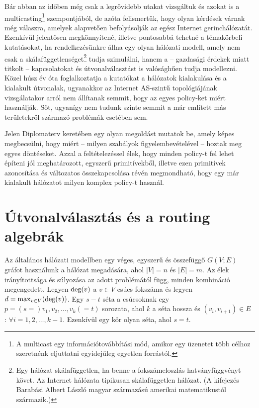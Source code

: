   Bár abban az időben még csak a legrövidebb utakat vizsgáltuk és azokat is a multicasting\footnote{A multicast egy információtovábbítási mód, amikor egy üzenetet több célhoz szeretnénk eljuttatni egyidejűleg egyetlen forrástól.} szempontjából, de azóta felismertük, hogy olyan kérdések várnak még válaszra, amelyek alapvetően befolyásolják az egész Internet gerinchálózatát. Ezenkívül jelentősen megkönnyítené, illetve pontosabbá tehetné a témakörbeli kutatásokat, ha rendelkezésünkre állna egy olyan hálózati modell, amely nem csak a skálafüggetlenséget\footnote{Egy hálózat skálafüggetlen, ha benne a fokszámeloszlás hatványfüggvényt követ. Az Internet hálózata tipikusan skálafüggetlen hálózat. (A kifejezés Barabási Albert László magyar származású amerikai matematikustól származik.)} tudja szimulálni, hanem a -- gazdasági érdekek miatt titkolt -- kapcsolatokat és útvonalválasztást is valósághűen tudja modellezni.\\

  Közel húsz év óta foglalkoztatja a kutatókat a hálózatok kialakulása és a kialakult útvonalak, ugyanakkor az Internet AS-szintű topológiájának vizsgálatakor arról nem állítanak semmit, hogy az egyes policy-ket miért használják. Sőt, ugyanígy nem tudunk szinte semmit a már említett más területekről származó problémák esetében sem.

  Jelen Diplomaterv keretében egy olyan megoldást mutatok be, amely képes megbecsülni, hogy miért -- milyen szabályok figyelembevételével -- hoztak meg egyes döntéseket. Azzal a feltételezéssel élek, hogy minden policy-t fel lehet építeni jól meghatározott, egyszerű primitívekből, illetve ezen primitívek azonosítása és változatos összekapcsolása révén megmondható, hogy egy már kialakult hálózatot milyen komplex policy-t használ.

  \section{Útvonalválasztás és a routing algebrák}\label{section_routingalgebrak}
  Az általános hálózati modellben egy véges, egyszerű és összefüggő $G(V; E)$ gráfot használunk a hálózat megadására, ahol $|V| = n$ és $|E| = m$. Az élek irányítottsága és súlyozása az adott problémától függ, minden kombináció megengedett. Legyen $\hbox{deg}(v)$ a $v \in V$ csúcs fokszáma és legyen $d = \max_{v \in V} (\hbox{deg}(v))$. Egy $s - t$ séta a csúcsoknak egy $p = (s =)v_1, v_2,\ldots, v_k(= t)$ sorozata, ahol $k$ a séta hossza és $(v_i, v_{i+1}) \in E$ : $\forall i = 1,2,\ldots,k-1$. Ezenkívül egy kör olyan séta, ahol $s = t$.\\

